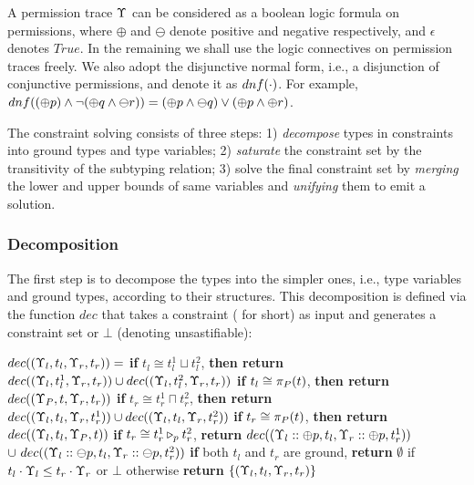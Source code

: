 {{{A permission trace $\trace$ can be considered as a boolean logic formula on permissions, where $\oplus$ and $\ominus$ denote positive and negative respectively, and $\epsilon$ denotes $True$.
In the remaining we shall use the logic connectives on permission traces freely.
We also adopt the disjunctive normal form, i.e., a disjunction of conjunctive permissions, and denote it as $\dnf{\cdot}$. For example, $\dnf{(\oplus p) \land \neg (\oplus q \land \ominus r)}  = (\oplus p \land \ominus q) \lor (\oplus p \land \oplus r) $.

The constraint solving consists of three steps: 1) \emph{decompose} types in constraints into ground types and type variables; 2) \emph{saturate} the constraint set by the transitivity of the subtyping relation; 3) solve the final constraint set by \emph{merging} the lower and upper bounds of same variables and \emph{unifying} them to emit a solution.


\subsubsection{\textbf{Decomposition}}
The first step \iffalse to solve the guarded constraints \fi is to decompose the types into the simpler ones, i.e., type variables and ground types, according to their structures.
This decomposition is defined via the function $dec$ that takes a constraint ( for short) as input and generates a constraint set or $\bot$ (denoting unsastifiable):

{\myeqsize\begin{algorithmic}
\STATE $dec(\cCondst{\trace_l}{t_l}{\trace_r}{t_r})=$
\STATE \quad \textbf{if} $t_l \cong t_l^1 \sqcup t_l^2$,  \textbf{then return} $dec(\cCondst{\trace_l}{t_l^1}{\trace_r}{t_r}) \cup dec(\cCondst{\trace_l}{t_l^2}{\trace_r}{t_r})$
\STATE \quad \textbf{if} $t_l \cong \app{t}{P}$, \textbf{then return} $dec(\cCondst{\trace_{P}}{t}{\trace_r}{t_r})$
\STATE \quad \textbf{if} $t_r \cong t_r^1 \sqcap t_r^2$,  \textbf{then return} $dec(\cCondst{\trace_l}{t_l}{\trace_r}{t_r^1}) \cup dec(\cCondst{\trace_l}{t_l}{\trace_r}{t_r^2})$
\STATE \quad \textbf{if} $t_r \cong \app{t}{P}$, \textbf{then return} $dec(\cCondst{\trace_l}{t_l}{\trace_{P}}{t})$
\STATE \quad \textbf{if} $t_r \cong \omerge{p}{t_r^1}{t_r^2}$, \textbf{return} $dec(\cCondst{\trace_l::\oplus p}{t_l}{\trace_r::\oplus p}{t_r^1})$
\STATE $\cup ~dec(\cCondst{\trace_l::\ominus p}{t_l}{\trace_r::\ominus p}{t_r^2})$
\STATE \quad \textbf{if} both $t_l$ and $t_r$ are ground, \textbf{return} $\emptyset$ if $t_l\cdot\trace_l \leq t_r\cdot\trace_r$ or $\bot$ otherwise
\STATE  \quad \textbf{return} $\{\cCondst{\trace_l}{t_l}{\trace_r}{t_r}\}$
\end{algorithmic}}

}}}

